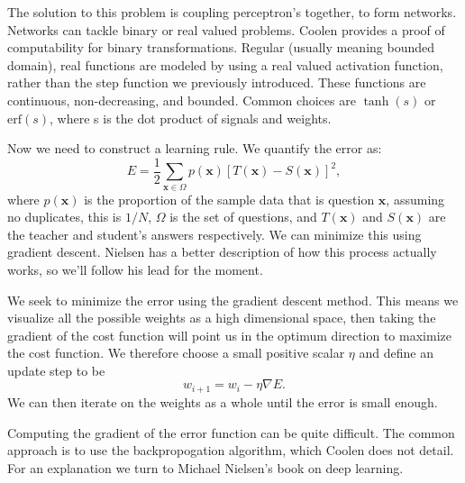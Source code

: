 \documentclass[]{article}
\newcommand{\B}[1]{\boldsymbol{#1}}
\newcommand{\txtfn}[2]{\text{#1}\left(#2\right)}
\theoremstyle{plain}
\theoremstyle{definition}
\begin{document}
The solution to this problem is coupling perceptron's together, to form networks. Networks can tackle binary or real valued problems. Coolen provides a proof of computability for binary transformations. Regular (usually meaning bounded domain), real functions are modeled by using a real valued activation function, rather than the step function we previously introduced. These functions are continuous, non-decreasing, and bounded. Common choices are $ \tanh(s) $ or $ \txtfn{erf}{s} $, where s is the dot product of signals and weights.



Now we need to construct a learning rule. We quantify the error as:
\[ E = \frac{1}{2}\sum\limits_{\B{x}\in\Omega}p(\B{x})\left[T(\B{x}) - S(\B{x})\right]^2, \] 
where $ p(\B{x}) $ is the proportion of the sample data that is question $ \B{x} $, assuming no duplicates, this is $ 1/N $, $ \Omega $ is the set of questions, and $ T(\B{x}) $ and $ S(\B{x}) $
are the teacher and student's answers respectively. We can minimize this using gradient descent. Nielsen has a better description of how this process actually works, so we'll follow his lead for the moment. 

We seek to minimize the error using the gradient descent method. This means we visualize all the possible weights as a high dimensional space, then taking the gradient of the cost function will point us in the optimum direction to maximize the cost function. We therefore choose a small positive scalar $ \eta $ and define an update step to be
\[ w_{i+1} = w_i - \eta\nabla E. \]
We can then iterate on the weights as a whole until the error is small enough. 

Computing the gradient of the error function can be quite difficult. The common approach is to use the backpropogation algorithm, which Coolen does not detail. For an explanation we turn to Michael Nielsen's book on deep learning.
\end{document}
